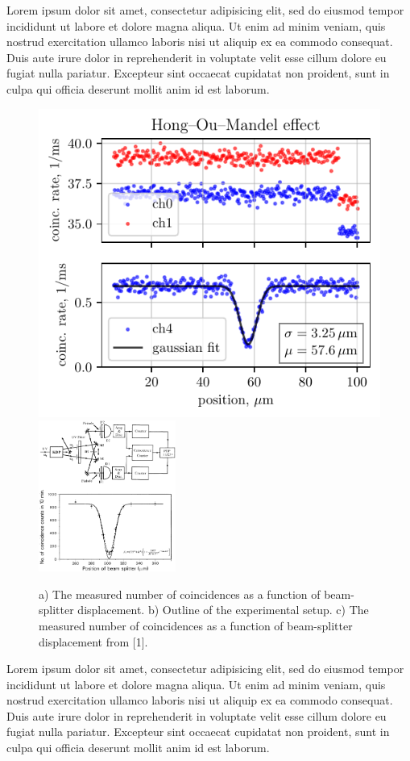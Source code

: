Lorem ipsum dolor sit amet, consectetur adipisicing elit, sed do eiusmod
tempor incididunt ut labore et dolore magna aliqua. Ut enim ad minim veniam,
quis nostrud exercitation ullamco laboris nisi ut aliquip ex ea commodo
consequat. Duis aute irure dolor in reprehenderit in voluptate velit esse
cillum dolore eu fugiat nulla pariatur. Excepteur sint occaecat cupidatat non
proident, sunt in culpa qui officia deserunt mollit anim id est laborum.

\begin{figure}[h]
    \centering
    \includegraphics{../labs/1/hom_plot.pdf}
    \hspace{5 mm} 
    \includegraphics[width=0.4\textwidth]{../labs/1/hom_base.png}
    \caption{a) The measured number of coincidences as a function of beam-splitter displacement. b) Outline of the experimental setup. c) The measured number of coincidences as a function of beam-splitter displacement from [1].}
\end{figure}
Lorem ipsum dolor sit amet, consectetur adipisicing elit, sed do eiusmod
tempor incididunt ut labore et dolore magna aliqua. Ut enim ad minim veniam,
quis nostrud exercitation ullamco laboris nisi ut aliquip ex ea commodo
consequat. Duis aute irure dolor in reprehenderit in voluptate velit esse
cillum dolore eu fugiat nulla pariatur. Excepteur sint occaecat cupidatat non
proident, sunt in culpa qui officia deserunt mollit anim id est laborum.


